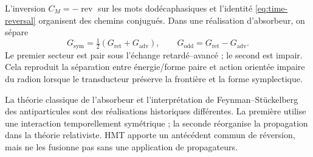 L'inversion \(C_M=-\operatorname{rev}\) sur les mots dodécaphasiques et
l'identité \eqref{eq:time-reversal} organisent des chemins conjugués. Dans une
réalisation d'absorbeur, on sépare
\[
G_{\mathrm{sym}}=\tfrac12(G_{\mathrm{ret}}+G_{\mathrm{adv}}),
\qquad
G_{\mathrm{odd}}=G_{\mathrm{ret}}-G_{\mathrm{adv}}.
\]
Le premier secteur est pair sous l'échange retardé--avancé ; le second est
impair. Cela reproduit la séparation entre énergie/forme paire et action
orientée impaire du radion lorsque le transducteur préserve la frontière et la forme
symplectique.

\begin{statusbox}
La théorie classique de l'absorbeur et l'interprétation de Feynman--Stückelberg des
antiparticules sont des réalisations historiques différentes. La première utilise une
interaction temporellement symétrique ; la seconde réorganise la propagation dans la
théorie relativiste. HMT apporte un antécédent commun de réversion, mais ne les
fusionne pas sans une application de propagateurs.
\end{statusbox}
